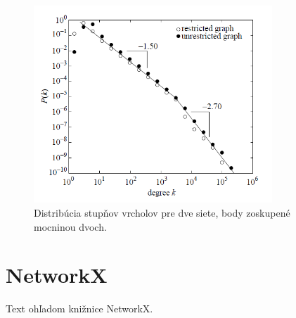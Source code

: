 \begin{figure}
    \centerline{\includegraphics[width=0.8\textwidth]{images/degdist.png}}
    \caption[Distribúcia stupňov vrcholov.]{Distribúcia stupňov vrcholov pre dve siete, body zoskupené mocninou dvoch\cite{cancho2001small}.}
    \label{obr:degdist}
\end{figure}

\clearpage

\section{NetworkX}\label{sec:networkx}

Text ohľadom knižnice NetworkX.